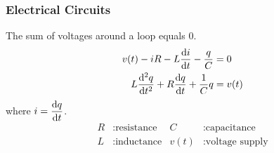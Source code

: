 \documentclass{article}
\begin{document}
\begin{multicols}{3}
    \subsubsection*{Electrical Circuits}
    The sum of voltages around a loop equals 0.
    \begin{align*}
        v(t) - iR - L \dv{i}{t} - \frac{q}{C}      & = 0    \\
        L \dv[2]{q}{t} + R\dv{q}{t} + \frac{1}{C}q & = v(t)
    \end{align*}
    where $\displaystyle i = \dv{q}{t}$.
    \begin{align*}
        R & : \text{resistance} & C    & : \text{capacitance}    \\
        L & : \text{inductance} & v(t) & : \text{voltage supply}
    \end{align*}

\end{multicols}
\end{document}
